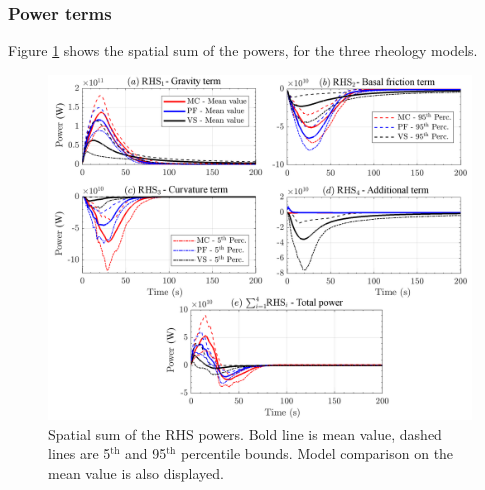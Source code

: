 \documentclass{article}
\begin{document}
\subsubsection{Power terms}
Figure \ref{fig:Colima-Power-spatial} shows the spatial sum of the powers, for the three rheology models.
\begin{figure}[H]
        \centering
        \includegraphics[width=1\textwidth]{BAF_VolcanDeColima/AveragedMeasurments/PowersColima.png}
        \caption{Spatial sum of the RHS powers. Bold line is mean value, dashed lines are 5$^{\mathrm{th}}$ and 95$^{\mathrm{th}}$ percentile bounds. Model comparison on the mean value is also displayed.}
        \label{fig:Colima-Power-spatial}
\end{figure}
\end{document}
